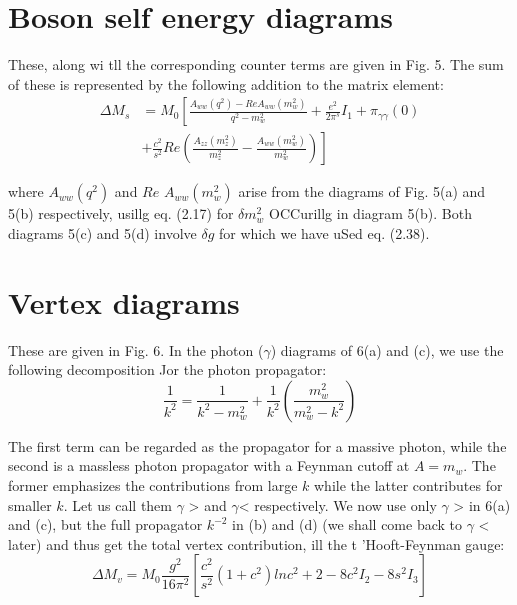 {\section*{Boson self energy diagrams}

These, along wi tll the corresponding counter terms are given in Fig. 5. The
sum of these is represented by the following addition to the matrix element: 
\begin{align*}
\Delta M_{s} & = M_{0} \left[ \frac{A_{ww}(q^{2})-Re A_{ww}(m^{2}_{w})}{q^{2}-m^{2}_{w}} + \frac{e^{2}}{2 \pi^{s}}I_{1} + \pi_{\gamma \gamma}(0)\right.\\
& + \left. \frac{c^{2}}{s^{2}}Re \left(\frac{A_{zz}(m^{2}_{z})}{m^{2}_{z}}- \frac{A_{ww}(m^{2}_{w})}{m^{2}_{w}}\right)\right]\tag{3.2}
\end{align*}


where $A_{ww}(q^{2})$ and $Re$ $A_{ww}(m^{2}_{w})$ arise from the diagrams of Fig. 5(a) and
5(b) respectively, usillg eq. (2.17) for $\delta m^{2}_{w}$ OCCurillg in diagram 5(b). Both
diagrams 5(c) and 5(d) involve $\delta g$ for which we have uSed eq. (2.38).

\section*{Vertex diagrams}

These are given in Fig. 6. In the photon ($\gamma$) diagrams of 6(a) and (c), we use the following decomposition Jor the photon propagator: 
\begin{equation*}
\frac{1}{k^{2}} = \frac{1}{k^{2}-m^{2}_{w}} + \frac{1}{k^{2}}\left(\frac{m^{2}_{w}}{m^{2}_{w}-k^{2}}\right)\tag{3.3} 
\end{equation*}

The first term can be regarded as the propagator for a massive photon, while the
second is a massless photon propagator with a Feynman cutoff at $A = m_{w}$. The
former emphasizes the contributions from large $k$ while the latter contributes
for smaller $k$. Let us call them $\gamma$ > and $\gamma$< respectively. We now use only $\gamma$ > in
6(a) and (c), but the full propagator $k^{-2}$ in (b) and (d) (we shall come back to
$\gamma$ < later) and thus get the total vertex contribution, ill the t 'Hooft-Feynman 
gauge:
\begin{equation*}
\Delta M_{v} = M_{0} \frac{g^{2}}{16 \pi^{2}} \left[\frac{c^{2}}{s^{2}} (1 + c^{2}) ln c^{2} + 2-8c^{2} I_{2}-8s^{2} I_{3}\right]\tag{3.4}
\end{equation*}

}
